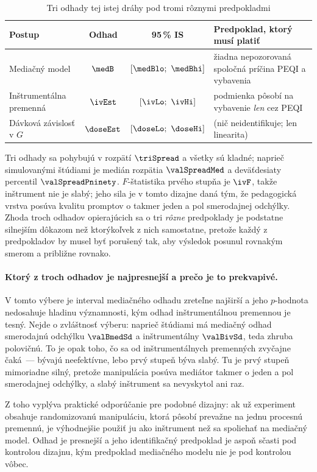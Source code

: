 \begin{table}[H]
\centering
\caption{Tri odhady tej istej dráhy pod tromi rôznymi predpokladmi}
\label{tab:triangulacia}
\small
\begin{tabularx}{\textwidth}{@{}l c c X@{}}
\toprule
\textbf{Postup} & \textbf{Odhad} & \textbf{95\,\% IS} & \textbf{Predpoklad, ktorý musí platiť} \\
\midrule
Mediačný model & $\medB$ & $[\medBlo;\ \medBhi]$ & žiadna nepozorovaná spoločná príčina PEQI a vybavenia \\
Inštrumentálna premenná & $\ivEst$ & $[\ivLo;\ \ivHi]$ & podmienka pôsobí na vybavenie \emph{len} cez PEQI \\
Dávková závislosť v $G$ & $\doseEst$ & $[\doseLo;\ \doseHi]$ & (nič neidentifikuje; len linearita) \\
\bottomrule
\end{tabularx}
\end{table}

Tri odhady sa pohybujú v rozpätí $\triSpread$ a všetky sú kladné; naprieč \valReps{} simulovanými štúdiami je medián rozpätia $\valSpreadMed$ a deväťdesiaty percentil $\valSpreadPninety$. $F$-štatistika prvého stupňa je $\ivF$, takže inštrument nie je slabý; jeho sila je v tomto dizajne daná tým, že pedagogická vrstva posúva kvalitu promptov o takmer jeden a pol smerodajnej odchýlky. Zhoda troch odhadov opierajúcich sa o tri \emph{rôzne} predpoklady je podstatne silnejším dôkazom než ktorýkoľvek z nich samostatne, pretože každý z predpokladov by musel byť porušený tak, aby výsledok posunul rovnakým smerom a približne rovnako.

\paragraph{Ktorý z troch odhadov je najpresnejší a prečo je to prekvapivé.} V tomto výbere je interval mediačného odhadu zreteľne najširší a jeho $p$-hodnota nedosahuje hladinu významnosti, kým odhad inštrumentálnou premennou je tesný. Nejde o zvláštnosť výberu: naprieč \valReps{} štúdiami má mediačný odhad smerodajnú odchýlku $\valBmedSd$ a inštrumentálny $\valBivSd$, teda zhruba polovičnú. To je opak toho, čo sa od inštrumentálnych premenných zvyčajne čaká~--- bývajú neefektívne, lebo prvý stupeň býva slabý. Tu je prvý stupeň mimoriadne silný, pretože manipulácia posúva mediátor takmer o jeden a pol smerodajnej odchýlky, a slabý inštrument sa nevyskytol ani raz.

Z toho vyplýva praktické odporúčanie pre podobné dizajny: ak už experiment obsahuje randomizovanú manipuláciu, ktorá pôsobí prevažne na jednu procesnú premennú, je výhodnejšie použiť ju ako inštrument než sa spoliehať na mediačný model. Odhad je presnejší a jeho identifikačný predpoklad je aspoň sčasti pod kontrolou dizajnu, kým predpoklad mediačného modelu nie je pod kontrolou vôbec.

